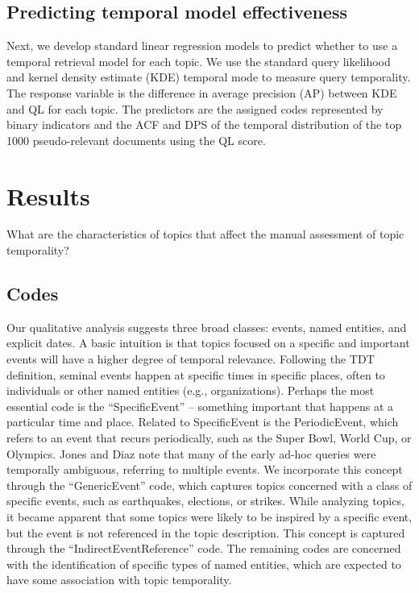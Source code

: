 \documentclass[runningheads,a4paper]{llncs}
\begin{document}
\subsection{Predicting temporal model effectiveness}
Next, we develop standard linear regression models to predict whether to use a temporal retrieval model for each topic. We use the standard query likelihood \cite{XXX} and kernel density estimate (KDE) temporal mode \cite{Efron2014} to measure query temporality. The response variable is the difference in average precision (AP) between KDE and QL for each topic. The predictors are the assigned codes represented by binary indicators and the ACF and DPS of the temporal distribution of the top 1000 pseudo-relevant documents using the QL score.

\section{Results}

What are the characteristics of topics that affect the manual assessment of topic temporality? 

\subsection{Codes}

Our qualitative analysis suggests three broad classes: events, named entities, and explicit dates. A basic intuition is that topics focused on a specific and important events will have a higher degree of temporal relevance. Following the TDT definition, seminal events happen at specific times in specific places, often to individuals or other named entities (e.g., organizations). Perhaps the most essential code is the ``SpecificEvent'' -- something important that happens at a particular time and place. Related to SpecificEvent is the PeriodicEvent, which refers to an event that recurs periodically, such as the Super Bowl, World Cup, or Olympics. Jones and Diaz \cite{Jones2007} note that many of the early ad-hoc queries were temporally ambiguous, referring to multiple events. We incorporate this concept through the ``GenericEvent'' code, which captures topics concerned with a class of specific events, such as earthquakes, elections, or strikes. While analyzing topics, it became apparent that some topics were likely to be inspired by a specific event, but the event is not referenced in the topic description. This concept is captured through the ``IndirectEventReference'' code. The remaining codes are concerned with the identification of specific types of named entities, which are expected to have some  association with topic temporality.
\end{document}
